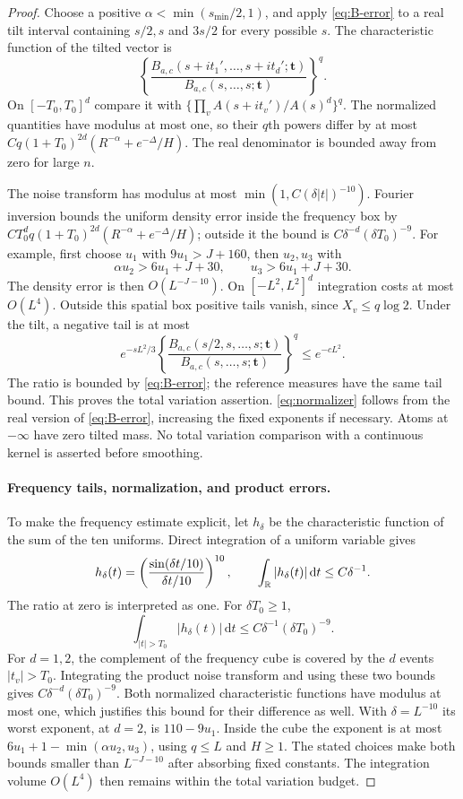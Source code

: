 \documentclass[11pt]{article}
\theoremstyle{definition}\newtheorem{definition}[theorem]{Definition}
\theoremstyle{remark}\newtheorem{remark}[theorem]{Remark}
\newcommand{\dd}{\,\mathrm d}\newcommand{\ind}{\mathbf1}
\numberwithin{equation}{section}\allowdisplaybreaks
\begin{document}
\begin{proof}
Choose a positive $\alpha<\min(s_{\min}/2,1)$, and apply
\eqref{eq:B-error} to a real tilt interval containing $s/2,s$ and $3s/2$
for every possible $s$. The characteristic function of the tilted vector
is
\[
 \left\{\frac{B_{a,c}(s+it_1',\ldots,s+it_d';\boldsymbol t)}
 {B_{a,c}(s,\ldots,s;\boldsymbol t)}\right\}^{q}.
\]
On $[-T_0,T_0]^d$ compare it with
$\{\prod_v A(s+it_v')/A(s)^d\}^{q}$.
The normalized quantities have modulus at most one, so their $q$th
powers differ by at most
$Cq(1+T_0)^{2d}(R^{-\alpha}+e^{-\Delta}/H)$.
The real denominator is bounded away from zero for large $n$.

The noise transform has modulus at most
$\min(1,C(\delta|t|)^{-10})$. Fourier inversion bounds the uniform
density error inside the frequency box by
$CT_0^d q(1+T_0)^{2d}(R^{-\alpha}+e^{-\Delta}/H)$; outside it the
bound is $C\delta^{-d}(\delta T_0)^{-9}$. For example, first choose
$u_1$ with $9u_1>J+160$, then $u_2,u_3$ with
\[
 \alpha u_2>6u_1+J+30,\qquad u_3>6u_1+J+30.
\]
The density error is then $O(L^{-J-10})$.
On $[-L^2,L^2]^d$ integration costs at most $O(L^4)$. Outside this
spatial box positive tails vanish, since $X_v\le q\log2$. Under the
tilt, a negative tail is at most
\[
 e^{-sL^2/3}
 \left\{\frac{B_{a,c}(s/2,s,\ldots,s;\boldsymbol t)}
 {B_{a,c}(s,\ldots,s;\boldsymbol t)}\right\}^{q}
 \le e^{-cL^2}.
\]
The ratio is bounded by \eqref{eq:B-error}; the reference measures have
the same tail bound. This proves the total variation assertion.
\eqref{eq:normalizer} follows from the real version of \eqref{eq:B-error},
increasing the fixed exponents if necessary. Atoms at $-\infty$ have
zero tilted mass. No total variation comparison with a continuous kernel
is asserted before smoothing.

\paragraph{Frequency tails, normalization, and product errors.}
To make the frequency estimate explicit, let $h_\delta$ be the
characteristic function of the sum of the ten uniforms. Direct
integration of a uniform variable gives
\[
 h_\delta(t)=
 \left(\frac{\sin(\delta t/10)}{\delta t/10}\right)^{10},
 \qquad
 \int_\R|h_\delta(t)|\dd t\le C\delta^{-1}.
\]
The ratio at zero is interpreted as one. For $\delta T_0\ge1$,
\[
 \int_{|t|>T_0}|h_\delta(t)|\dd t
 \le C\delta^{-1}(\delta T_0)^{-9}.
\]
For $d=1,2$, the complement of the frequency cube is covered by
the $d$ events $|t_v|>T_0$. Integrating the product noise transform
and using these two bounds gives
$C\delta^{-d}(\delta T_0)^{-9}$. Both normalized characteristic
functions have modulus at most one, which justifies this bound
for their difference as well. With $\delta=L^{-10}$ its worst
exponent, at $d=2$, is $110-9u_1$. Inside the cube the exponent is
at most $6u_1+1-\min(\alpha u_2,u_3)$, using $q\le L$ and $H\ge1$.
The stated choices make both bounds smaller than $L^{-J-10}$
after absorbing fixed constants. The integration volume
$O(L^4)$ then remains within the total variation budget.


\end{proof}
\end{document}
